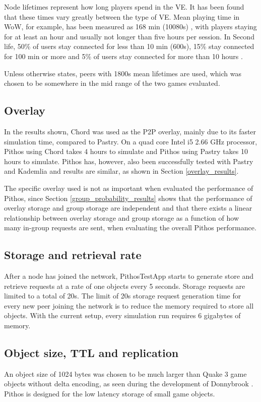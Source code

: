 Node lifetimes represent how long players spend in the VE. It has been found that these times vary greatly between the type of VE. Mean playing time in WoW, for example, has been measured as 168 min (10080s) \cite{wow_gameplay_hours}, with players staying for at least an hour and usually not longer than five hours per session. In Second life, 50\% of users stay connected for less than 10 min (600s), 15\% stay connected for 100 min or more and 5\% of users stay connected for more than 10 hours \cite{Varvello_life_in_second_life}.

Unless otherwise states, peers with 1800s mean lifetimes are used, which was chosen to be somewhere in the mid range of the two games evaluated.

\subsection{Overlay}
In the results shown, Chord was used as the P2P overlay, mainly due to its faster simulation time, compared to Pastry. On a quad core Intel i5 2.66 GHz processor, Pithos using Chord takes 4 hours to simulate and Pithos using Pastry takes 10 hours to simulate. Pithos has, however, also been successfully tested with Pastry and Kademlia and results are similar, as shown in Section \ref{overlay_results}.

The specific overlay used is not as important when evaluated the performance of Pithos, since Section \ref{group_probability_results} shows that the performance of overlay storage and group storage are independent and that there exists a linear relationship between overlay storage and group storage as a function of how many in-group requests are sent, when evaluating the overall Pithos performance.

\subsection{Storage and retrieval rate}
After a node has joined the network, PithosTestApp starts to generate store and retrieve requests at a rate of one objects every 5 seconds. Storage requests are limited to a total of 20s. The limit of 20s storage request generation time for every new peer joining the network is to reduce the memory required to store all objects. With the current setup, every simulation run requires 6 gigabytes of memory.

\subsection{Object size, TTL and replication}
An object size of 1024 bytes was chosen to be much larger than Quake 3 game objects without delta encoding, as seen during the development of Donnybrook \cite{Bharambe_Donnybrook}. Pithos is designed for the low latency storage of small game objects.

